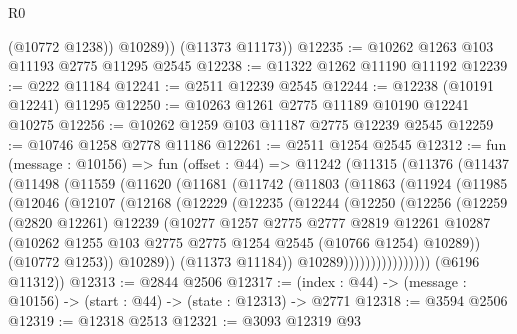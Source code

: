 \begin{lexlean}{R0}
\begin{coremodule}
            (@10772 @1238))
          @10289))
      (@11373 @11173))
@12235 := @10262 @1263 @103 @11193 @2775 @11295 @2545
@12238 := @11322 @1262 @11190 @11192
@12239 := @222 @11184
@12241 := @2511 @12239 @2545
@12244 := @12238 (@10191 @12241) @11295
@12250 := @10263 @1261 @2775 @11189 @10190 @12241 @10275
@12256 := @10262 @1259 @103 @11187 @2775 @12239 @2545
@12259 := @10746 @1258 @2778 @11186
@12261 := @2511 @1254 @2545
@12312 := fun (message : @10156) =>
  fun (offset : @44) =>
  @11242
    (@11315
      (@11376
        (@11437
          (@11498
            (@11559
              (@11620
                (@11681
                  (@11742
                    (@11803
                      (@11863
                        (@11924
                          (@11985
                            (@12046
                              (@12107
                                (@12168
                                  (@12229
                                    (@12235
                                      (@12244
                                        (@12250
                                          (@12256
                                            (@12259
                                              (@2820 @12261)
                                              @12239
                                              (@10277
                                                @1257
                                                @2775
                                                @2777
                                                @2819
                                                @12261
                                                @10287
                                                (@10262
                                                  @1255
                                                  @103
                                                  @2775
                                                  @2775
                                                  @1254
                                                  @2545
                                                  (@10766 @1254)
                                                  @10289))
                                              (@10772 @1253))
                                            @10289))
                                        (@11373 @11184))
                                      @10289))))))))))))))))
      (@6196 @11312))
@12313 := @2844 @2506
@12317 := (index : @44) -> (message : @10156) -> (start : @44) -> (state : @12313) -> @2771
@12318 := @3594 @2506
@12319 := @12318 @2513
@12321 := @3093 @12319 @93

\end{coremodule}
\end{lexlean}
